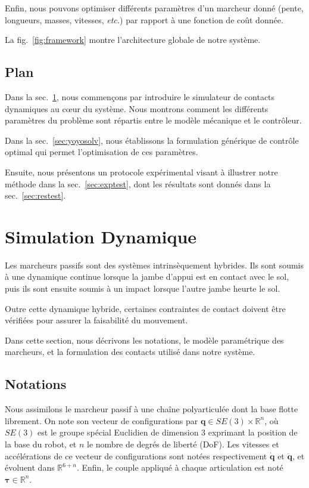 \documentclass[french,A4paper,]{book}
\begin{document}
Enfin, nous pouvons optimiser différents paramètres d'un marcheur donné
(pente, longueurs, masses, vitesses, \emph{etc.}) par rapport à une
fonction de coût donnée.

La fig.~\ref{fig:framework} montre l'architecture globale de notre
système.

\subsection{Plan}\label{plan}

Dans la sec.~\ref{sec:yoyosimu}, nous commençons par introduire le
simulateur de contacts dynamiques au cœur du système. Nous montrons
comment les différents paramètres du problème sont répartis entre le
modèle mécanique et le contrôleur.

Dans la sec.~\ref{sec:yoyosolv}, nous établissons la formulation
générique de contrôle optimal qui permet l'optimisation de ces
paramètres.

Ensuite, nous présentons un protocole expérimental visant à illustrer
notre méthode dans la sec.~\ref{sec:exptest}, dont les résultats sont
donnés dans la sec.~\ref{sec:restest}.

\section{Simulation Dynamique}\label{sec:yoyosimu}

Les marcheurs passifs sont des systèmes intrinsèquement hybrides. Ils
sont soumis à une dynamique continue lorsque la jambe d'appui est en
contact avec le sol, puis ils sont ensuite soumis à un impact lorsque
l'autre jambe heurte le sol.

Outre cette dynamique hybride, certaines contraintes de contact doivent
être vérifiées pour assurer la faisabilité du mouvement.

Dans cette section, nous décrivons les notations, le modèle paramétrique
des marcheurs, et la formulation des contacts utilisé dans notre
système.

\subsection{Notations}\label{notations}

Nous assimilons le marcheur passif à une chaîne polyarticulée dont la
base flotte librement. On note son vecteur de configurations par
\(\bm q \in SE(3) \times \mathbb{R}^n\), où \(SE(3)\) est le groupe
spécial Euclidien de dimension 3 exprimant la position de la base du
robot, et \(n\) le nombre de degrés de liberté (DoF). Les vitesses et
accélérations de ce vecteur de configurations sont notées respectivement
\(\dot{\bm q}\) et \(\ddot{\bm q}\), et évoluent dans
\(\mathbb{R}^{6+n}\). Enfin, le couple appliqué à chaque articulation
est noté \(\bm \tau \in \mathbb{R}^n\).
\end{document}
